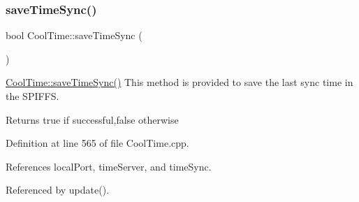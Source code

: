\subsubsection{\texorpdfstring{save\+Time\+Sync()}{saveTimeSync()}}
{\footnotesize\ttfamily bool Cool\+Time\+::save\+Time\+Sync (\begin{DoxyParamCaption}{ }\end{DoxyParamCaption})}

\hyperlink{classCoolTime_ae9658c9b377510d469e3b88edf33ee85}{Cool\+Time\+::save\+Time\+Sync()} This method is provided to save the last sync time in the S\+P\+I\+F\+FS.

\begin{DoxyReturn}{Returns}
true if successful,false otherwise 
\end{DoxyReturn}


Definition at line 565 of file Cool\+Time.\+cpp.



References local\+Port, time\+Server, and time\+Sync.



Referenced by update().


